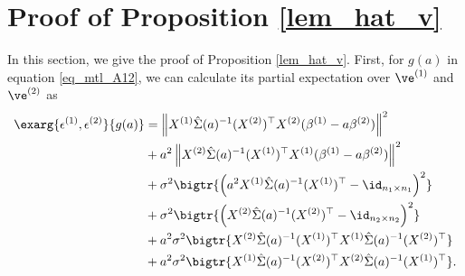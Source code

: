 \documentclass[aos,preprint]{imsart}
\begin{document}
\section{Proof of  Proposition \ref{lem_hat_v}}\label{app_iso_cov_prop}
\iffalse
 We follow a similar logic to the proof of Theorem \ref{thm_many_tasks}.
We first characterize the global minimizer of $f(A, B)$ in the random-effect model.
Based on the characterization, we reduce the prediction loss of hard parameter sharing to the bias-variance asymptotic limits.
Finally, we prove Corollary \ref{cor_MTL_loss} based on these limiting estimates.
We set up several notations.
In the two-task case, the optimization objective $f(A, B)$ is equal to
	\begin{align}
		f(A, B) =   \bignorm{X^{(1)} B A_1 - Y^{(1)}}^2+ \bignorm{X^{(2)} B A_2 - Y^{(2)}}^2, \label{eq_mtl_2task_cov}
	\end{align}
	where $B \in \real^{p}$ and $A = [A_1, A_2]\in \real^{2}$ because the width of $B$ is one.
Without loss of generality, we assume that $A_1$ and $A_2$ are both nonzero.
Otherwise, the problem reduces to STL. %
Using the local optimality condition $\frac{\partial f}{\partial B} = 0$, we obtain that $\hat{B}$ satisfies the following
	\begin{align}
		\hat{B} \define  \left[A_1^2 (X^{(1)})^{\top}X^{(1)} + A_2^2 (X^{(2)})^{\top}X^{(2)}\right]^{-1} \left[A_1 (X^{(1))})^{\top}Y^{(1)} + A_2 (X^{(2)})^{\top}Y^{(2)}\right]. \label{eq_Bhat_2task} %
	\end{align}
We denote $\hat \Sigma(x)= x^2 (X^{(1)})^\top X^{(1)}  + (X^{(2)})^\top X^{(2)}$.
Applying $\hat B$ to equation \eqref{eq_mtl_2task_cov}, we obtain an objective that only depends on $x:=A_1/A_2$ as follows %
\fi
In this section, we give the proof of Proposition \ref{lem_hat_v}. First, for $g(a)$ in equation \eqref{eq_mtl_A12}, we can calculate its partial expectation over $\ve^{(1)}$ and $\ve^{(2)}$ as
\begin{align}
\exarg{\epsilon^{(1)}, \epsilon^{(2)}}{g(a)}
&= \left\| X^{(1)} \hat\Sigma(a)^{-1} (X^{(2)})^\top X^{(2)} (\beta^{(1)}-a\beta^{(2)})\right\|^2 \nonumber\\
&+a^2 \left\| X^{(2)} \hat\Sigma(a)^{-1} (X^{(1)})^\top X^{(1)} (\beta^{(1)}-a\beta^{(2)})\right\|^2  \nonumber\\
& + \sigma^2 \bigtr{  \left(a^2 X^{(1)}\hat \Sigma(a)^{-1} (X^{(1)})^\top-\id_{n_1\times n_1}\right)^2} \nonumber\\
&+\sigma^2 \bigtr { \left(X^{(2)}\hat \Sigma(a)^{-1} (X^{(2)})^\top-\id_{n_2\times n_2}\right)^2 }   \nonumber\\
&+  a^2 \sigma^2\bigtr{ X^{(2)}\hat \Sigma(a)^{-1}  (X^{(1)})^\top X^{(1)}\hat\Sigma(a)^{-1} (X^{(2)})^\top } \nonumber\\
& +a^2 \sigma^2\bigtr { X^{(1)}\hat \Sigma(a)^{-1}  (X^{(2)})^\top X^{(2)}\hat\Sigma(a)^{-1} (X^{(1)})^\top }. \label{Eg(x)}
\end{align}
\end{document}
